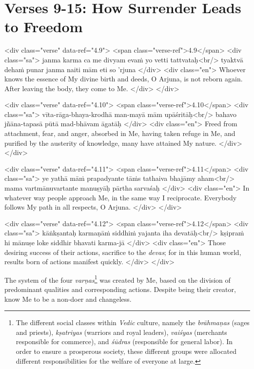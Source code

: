 \section{Verses 9-15: How Surrender Leads to Freedom}\label{sec-verses-9-15-how-surrender-leads-to-freedom}

\begin{html}
<div class="verse" data-ref="4.9">
  <span class="verse-ref">4.9</span>
  <div class="sa">
    janma karma ca me divyam evaṁ yo vetti tattvataḥ<br/>
    tyaktvā dehaṁ punar janma naiti mām eti so ’rjuna
  </div>
  <div class="en">
    Whoever knows the essence of My divine birth and deeds, O Arjuna, is not reborn again. After leaving the body, they come to Me.
  </div>
</div>
\end{html}



\begin{html}
<div class="verse" data-ref="4.10">
  <span class="verse-ref">4.10</span>
  <div class="sa">
    vīta-rāga-bhaya-krodhā man-mayā mām upāśritāḥ<br/>
    bahavo jñāna-tapasā pūtā mad-bhāvam āgatāḥ
  </div>
  <div class="en">
    Freed from attachment, fear, and anger, absorbed in Me, having taken refuge in Me, and purified by the austerity of knowledge, many have attained My nature.
  </div>
</div>
\end{html}



\begin{html}
<div class="verse" data-ref="4.11">
  <span class="verse-ref">4.11</span>
  <div class="sa">
    ye yathā māṁ prapadyante tāṁs tathaiva bhajāmy aham<br/>
    mama vartmānuvartante manuṣyāḥ pārtha sarvaśaḥ
  </div>
  <div class="en">
    In whatever way people approach Me, in the same way I reciprocate. Everybody follows My path in all respects, O Arjuna.
  </div>
</div>
\end{html}



\begin{html}
<div class="verse" data-ref="4.12">
  <span class="verse-ref">4.12</span>
  <div class="sa">
    kāṅkṣantaḥ karmaṇāṁ siddhiṁ yajanta iha devatāḥ<br/>
    kṣipraṁ hi mānuṣe loke siddhir bhavati karma-jā
  </div>
  <div class="en">
    Those desiring success of their actions, sacrifice to the \textit{devas}; for in this human world, results born of actions manifest quickly.
  </div>
</div>
\end{html}


{The system of the four \textit{varṇas}\footnote{The different social classes within \textit{Vedic} culture, namely the \textit{brāhmaṇas} (sages and priests), \textit{kṣatriyas} (warriors and royal leaders), \textit{vaiśyas} (merchants responsible for commerce), and \textit{śūdras} (responsible for general labor). In order to ensure a prosperous society, these different groups were allocated different responsibilities for the welfare of everyone at large.} was created by Me, based on the division of predominant qualities and corresponding actions. Despite being their creator, know Me to be a non-doer and changeless.}


